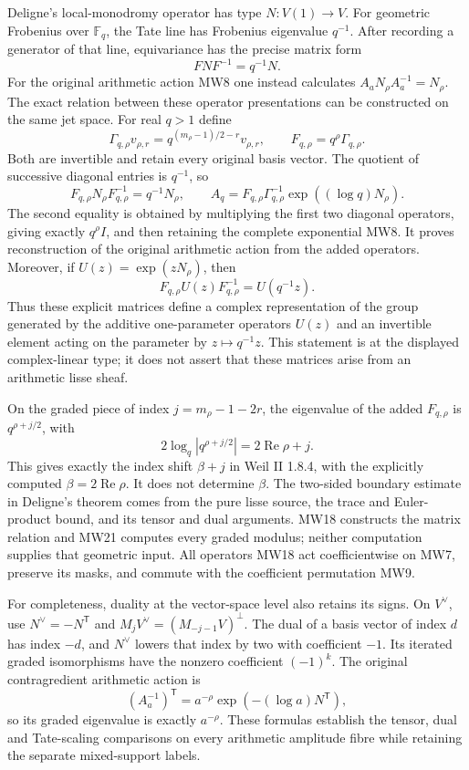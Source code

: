 Deligne's local-monodromy operator has type \(N:V(1)\to V\).
For geometric Frobenius over \(\mathbb F_q\), the Tate line has
Frobenius eigenvalue \(q^{-1}\). After recording a generator of
that line, equivariance has the precise matrix form
\[
             FNF^{-1}=q^{-1}N .
 \tag{MW17}
\]
For the original arithmetic action MW8 one instead calculates
\(A_aN_\rho A_a^{-1}=N_\rho\). The exact relation between these
operator presentations can be constructed on the same jet space.
For real \(q>1\) define
\[
 \Gamma_{q,\rho}v_{\rho,r}
   =q^{(m_\rho-1)/2-r}v_{\rho,r},\qquad
 F_{q,\rho}=q^\rho\Gamma_{q,\rho}.
 \tag{MW18}
\]
Both are invertible and retain every original basis vector.
The quotient of successive diagonal entries is \(q^{-1}\), so
\[
 F_{q,\rho}N_\rho F_{q,\rho}^{-1}=q^{-1}N_\rho,\qquad
 A_q=F_{q,\rho}\Gamma_{q,\rho}^{-1}
                     \exp((\log q)N_\rho).
 \tag{MW19}
\]
The second equality is obtained by multiplying the first two
diagonal operators, giving exactly \(q^\rho I\), and then retaining
the complete exponential MW8. It proves reconstruction of the
original arithmetic action from the added operators.
Moreover, if \(U(z)=\exp(zN_\rho)\), then
\[
 F_{q,\rho}U(z)F_{q,\rho}^{-1}=U(q^{-1}z).
 \tag{MW20}
\]
Thus these explicit matrices define a complex representation of the
group generated by the additive one-parameter operators \(U(z)\)
and an invertible element acting on the parameter by \(z\mapsto
q^{-1}z\). This statement is at the displayed complex-linear
type; it does not assert that these matrices arise from an
arithmetic lisse sheaf.

On the graded piece of index \(j=m_\rho-1-2r\), the eigenvalue
of the added \(F_{q,\rho}\) is \(q^{\rho+j/2}\), with
\[
 2\log_q|q^{\rho+j/2}|=2\operatorname{Re}\rho+j .
 \tag{MW21}
\]
This gives exactly the index shift \(\beta+j\) in Weil II 1.8.4,
with the explicitly computed \(\beta=2\operatorname{Re}\rho\).
It does not determine \(\beta\). The two-sided boundary estimate in
Deligne's theorem comes from the pure lisse source, the trace and
Euler-product bound, and its tensor and dual arguments. MW18
constructs the matrix relation and MW21 computes every graded
modulus; neither computation supplies that geometric input.
All operators MW18 act coefficientwise on MW7, preserve its masks,
and commute with the coefficient permutation MW9.

For completeness, duality at the vector-space level also retains
its signs. On \(V^\vee\), use \(N^\vee=-N^{\mathsf T}\) and
\(M_jV^\vee=(M_{-j-1}V)^\perp\). The dual of a basis vector of
index \(d\) has index \(-d\), and \(N^\vee\) lowers that index
by two with coefficient \(-1\). Its iterated graded isomorphisms
have the nonzero coefficient \((-1)^k\).
The original contragredient arithmetic action is
\[
 (A_a^{-1})^{\mathsf T}
       =a^{-\rho}\exp(-(\log a)N^{\mathsf T}),
 \tag{MW22}
\]
so its graded eigenvalue is exactly \(a^{-\rho}\).
These formulas establish the tensor, dual and Tate-scaling
comparisons on every arithmetic amplitude fibre while retaining
the separate mixed-support labels.

